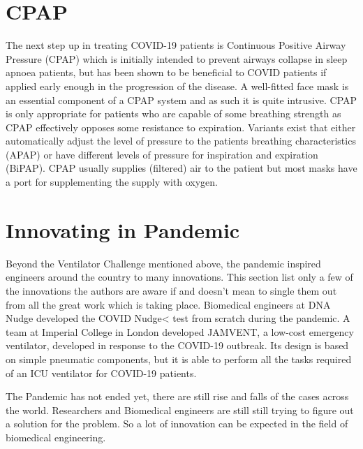 \documentclass[12pt]{article}
\begin{document}
 \section{CPAP}
 
 The next step up in treating COVID-19 patients is Continuous Positive Airway Pressure (CPAP) which is initially intended to prevent airways collapse in sleep apnoea patients, but has been shown to be beneficial to COVID patients if applied early enough in the progression of the disease. A well-fitted face mask is an essential component of a CPAP system and as such it is quite intrusive. CPAP is only appropriate for patients who are capable of some breathing strength as CPAP effectively opposes some resistance to expiration. Variants exist that either automatically adjust the level of pressure to the patients breathing characteristics (APAP) or have different levels of pressure for inspiration and expiration (BiPAP). CPAP usually supplies (filtered) air to the patient but most masks have a port for supplementing the supply with oxygen.
 
 \section{Innovating in Pandemic}
 
 Beyond the Ventilator Challenge mentioned above, the pandemic inspired engineers around the country to many innovations. This section list only a few of the innovations the authors are aware if and doesn’t mean to single them out from all the great work which is taking place. Biomedical engineers at DNA Nudge developed the COVID Nudge< test from scratch during the pandemic. A team at Imperial College in London developed JAMVENT, a low-cost emergency ventilator, developed in response to the COVID-19 outbreak. Its design is based on simple pneumatic components, but it is able to perform all the tasks required of an ICU ventilator for COVID-19 patients.
 
 \indent
 
 The Pandemic has not ended yet, there are still rise and falls of the cases across the world. Researchers and Biomedical engineers are still still trying to figure out a solution for the problem. So a lot of innovation can be expected in the field of biomedical engineering.
\end{document}

